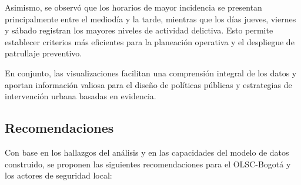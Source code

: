 \documentclass[12pt,letterpaper]{article}
\begin{document}
Asimismo, se observó que los horarios de mayor incidencia se presentan principalmente entre el mediodía y la tarde, mientras que los días jueves, viernes y sábado registran los mayores niveles de actividad delictiva. Esto permite establecer criterios más eficientes para la planeación operativa y el despliegue de patrullaje preventivo.

En conjunto, las visualizaciones facilitan una comprensión integral de los datos y aportan información valiosa para el diseño de políticas públicas y estrategias de intervención urbana basadas en evidencia.

\subsection{Recomendaciones}

Con base en los hallazgos del análisis y en las capacidades del modelo de datos construido, se proponen las siguientes recomendaciones para el OLSC-Bogotá y los actores de seguridad local:
\end{document}
